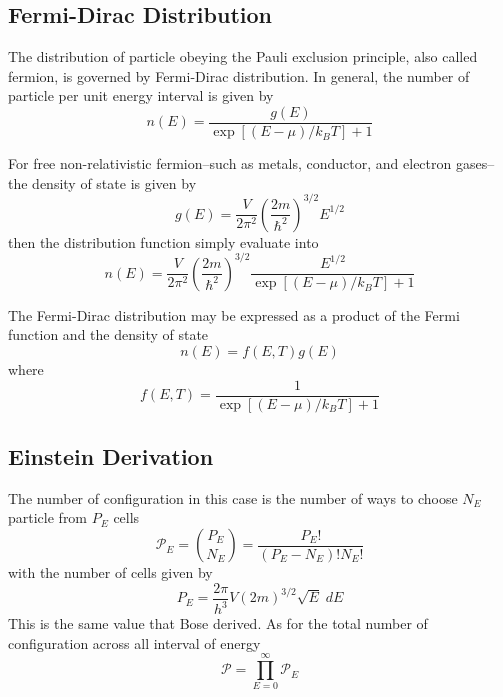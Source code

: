 \documentclass[../../../Main.tex]{subfiles}
\begin{document}
\subsection{Fermi-Dirac Distribution}
The distribution of particle obeying the Pauli exclusion principle, also called fermion, is governed by Fermi-Dirac distribution. In general, the number of particle per unit energy interval is given by 
\begin{equation*}
    n(E)=\frac{g(E)}{\exp\left[(E-\mu)/k_BT\right]+1}
\end{equation*}

For free non-relativistic fermion--such as metals, conductor, and electron gases--the density of state is given by
\begin{equation*}
    g(E)=\frac{V}{2\pi^2}\left(\frac{2m}{\hbar^2}\right)^{3/2}E^{1/2}
\end{equation*}
then the distribution function simply evaluate into
\begin{equation*}
    n(E)=\frac{V}{2\pi^2}\left(\frac{2m}{\hbar^2}\right)^{3/2}\frac{{E}^{1/2}}{\exp\left[(E-\mu)/k_BT\right]+1}
\end{equation*}

The Fermi-Dirac distribution may be expressed as a product of the Fermi function and the density of state
\begin{equation*}
    n(E)=f(E,T)g(E)
\end{equation*}
where
\begin{equation*}
    f(E,T)=\frac{1}{\exp\left[(E-\mu)/k_BT\right]+1}
\end{equation*}
\subsection{Einstein Derivation}
The number of configuration in this case is the number of ways to choose $N_E$ particle from $P_E$ cells
\begin{equation*}
    \mathcal{P}_E={P_E \choose N_E}=\frac{P_E!}{(P_E-N_E)!N_E!}
\end{equation*}
with the number of cells given by
\begin{equation*}
    P_E= \frac{2\pi}{h^3}V(2m)^{3/2}\sqrt{E}\;dE
\end{equation*}
This is the same value that Bose derived. As for the total number of configuration across all interval of energy
\begin{equation*}
    \mathcal{P}=\prod_{E=0}^{\infty}\mathcal{P}_E
\end{equation*}
\end{document}

